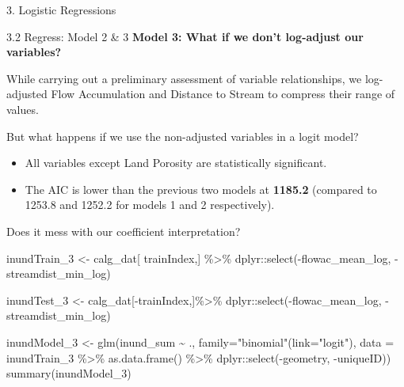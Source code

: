 \documentclass[
  ignorenonframetext,
]{beamer}
\newenvironment{Shaded}{\begin{snugshade}}{\end{snugshade}}
\newcommand{\AttributeTok}[1]{\textcolor[rgb]{0.77,0.63,0.00}{#1}}
\newcommand{\FunctionTok}[1]{\textcolor[rgb]{0.00,0.00,0.00}{#1}}
\newcommand{\NormalTok}[1]{#1}
\newcommand{\OtherTok}[1]{\textcolor[rgb]{0.56,0.35,0.01}{#1}}
\newcommand{\SpecialCharTok}[1]{\textcolor[rgb]{0.00,0.00,0.00}{#1}}
\newcommand{\StringTok}[1]{\textcolor[rgb]{0.31,0.60,0.02}{#1}}
\begin{document}
\begin{frame}[fragile]{3. Logistic Regressions}
\begin{block}{3.2 Regress: Model 2 \& 3}
\textbf{Model 3: What if we don't log-adjust our variables?}

While carrying out a preliminary assessment of variable relationships,
we log-adjusted Flow Accumulation and Distance to Stream to compress
their range of values.

But what happens if we use the non-adjusted variables in a logit model?

\begin{itemize}
\item
  All variables except Land Porosity are statistically significant.
\item
  The AIC is lower than the previous two models at \textbf{1185.2}
  (compared to 1253.8 and 1252.2 for models 1 and 2 respectively).
\end{itemize}

Does it mess with our coefficient interpretation?

\begin{Shaded}
\begin{Highlighting}[]
\NormalTok{inundTrain\_3 }\OtherTok{\textless{}{-}}\NormalTok{ calg\_dat[ trainIndex,] }\SpecialCharTok{\%\textgreater{}\%} 
\NormalTok{  dplyr}\SpecialCharTok{::}\FunctionTok{select}\NormalTok{(}\SpecialCharTok{{-}}\NormalTok{flowac\_mean\_log, }\SpecialCharTok{{-}}\NormalTok{streamdist\_min\_log)}

\NormalTok{inundTest\_3  }\OtherTok{\textless{}{-}}\NormalTok{ calg\_dat[}\SpecialCharTok{{-}}\NormalTok{trainIndex,]}\SpecialCharTok{\%\textgreater{}\%} 
\NormalTok{  dplyr}\SpecialCharTok{::}\FunctionTok{select}\NormalTok{(}\SpecialCharTok{{-}}\NormalTok{flowac\_mean\_log, }\SpecialCharTok{{-}}\NormalTok{streamdist\_min\_log)}


\NormalTok{inundModel\_3 }\OtherTok{\textless{}{-}} \FunctionTok{glm}\NormalTok{(inund\_sum }\SpecialCharTok{\textasciitilde{}}\NormalTok{ ., }
                    \AttributeTok{family=}\StringTok{"binomial"}\NormalTok{(}\AttributeTok{link=}\StringTok{"logit"}\NormalTok{), }\AttributeTok{data =}\NormalTok{ inundTrain\_3 }\SpecialCharTok{\%\textgreater{}\%}
                                                            \FunctionTok{as.data.frame}\NormalTok{() }\SpecialCharTok{\%\textgreater{}\%}
\NormalTok{                                                            dplyr}\SpecialCharTok{::}\FunctionTok{select}\NormalTok{(}\SpecialCharTok{{-}}\NormalTok{geometry, }\SpecialCharTok{{-}}\NormalTok{uniqueID))}
\FunctionTok{summary}\NormalTok{(inundModel\_3)}
\end{Highlighting}
\end{Shaded}


\end{block}
\end{frame}
\end{document}
